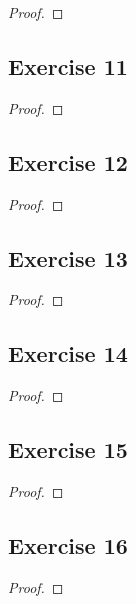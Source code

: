 \documentclass[14pt]{extarticle}
\begin{document}
\begin{proof}

\end{proof}

\subsection{Exercise 11}

\begin{proof}

\end{proof}

\subsection{Exercise 12}

\begin{proof}

\end{proof}

\subsection{Exercise 13}

\begin{proof}

\end{proof}

\subsection{Exercise 14}

\begin{proof}

\end{proof}

\subsection{Exercise 15}

\begin{proof}

\end{proof}

\subsection{Exercise 16}

\begin{proof}

\end{proof}
\end{document}
